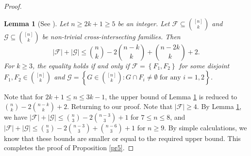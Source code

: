 \documentclass[11pt]{article}
\numberwithin{equation}{section}
\newtheorem{lemma}[theorem]{Lemma}
\begin{document}
\begin{proof}
\begin{lemma}[See \cite{F98, F24}] \label{F24}
Let $n \geq 2k+1\geq 5$ be an integer. Let $\mathcal{F} \subseteq\binom{[n]}{k}$ and $\mathcal{G} \subseteq\binom{[n]}{k}$ be non-trivial cross-intersecting families. Then
$$
|\mathcal{F}|+|\mathcal{G}| \leq\binom{n}{k}-2\binom{n-k}{k}+\binom{n-2k}{k}+2.
$$
For $k\geq 3$, the equality holds if and only if $\mathcal{F}=\left\{F_1, F_2\right\}$ for some disjoint $F_1, F_2 \in\binom{[n]}{k}$ and $\mathcal{G}=\left\{G \in\binom{[n]}{k}: G \cap F_i \neq\emptyset \text{ for any } i=1, 2\right\}$.
\end{lemma}
Note that for $ 2k+1\leq n\leq 3k-1$, the upper bound of Lemma \ref{F24} is
reduced to $\binom{n}{k}-2\binom{n-k}{k}+2$. Returning to our proof. Note that $|\mathcal{F}|\geq 4$. By Lemma \ref{F24}, we have
$
|\mathcal{F}|+|\mathcal{G}| \leq\binom{n}{3}-2\binom{n-3}{3}+1
$
for $ 7 \leq n\leq 8$,
and
$
|\mathcal{F}|+|\mathcal{G}| \leq\binom{n}{3}-2\binom{n-3}{3}+\binom{n-6}{3}+1
$
for $ n\geq 9$. By simple calculations, we know that these bounds are smaller or equal to the required upper bound.
This completes the proof of Proposition \ref{pr5}.
\end{proof}
\end{document}
